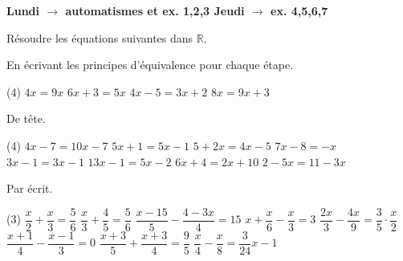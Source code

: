 \documentclass[a4paper,12pt]{report}
\begin{document}
{\bfseries Lundi $\longrightarrow$ automatismes et ex. 1,2,3  \hfill Jeudi $\longrightarrow$ ex. 4,5,6,7}


Résoudre les équations suivantes dans $\mathbb{R}$.

En écrivant les principes d'équivalence pour chaque étape.
	\begin{tasks}(4)
\task $4 x=9 x$
\task $6 x+3=5 x$
\task $4 x-5=3 x+2$
\task $8 x=9 x+3$
\end{tasks}
De tête.
\begin{tasks}(4)
\task $4 x-7=10 x-7$
\task $5 x+1=5 x-1$
\task $5+2 x=4 x-5$
\task $7 x-8=-x$
\task $3 x-1=3 x-1$
\task $13 x-1=5 x-2$
\task $6 x+4=2 x+10$
\task $2-5 x=11-3 x$
\end{tasks}

Par écrit.
	\begin{tasks}(3)
\task $\dfrac{x}{2}+\dfrac{x}{3}=\dfrac{5}{6}$
\task $\dfrac{x}{3}+\dfrac{4}{5}=\dfrac{5}{6}$
\task $\dfrac{x-15}{5}-\dfrac{4-3 x}{4}=15$
\task $x+\dfrac{x}{6}-\dfrac{x}{3}=3$
\task $\dfrac{2 x}{3}-\dfrac{4 x}{9}=\dfrac{3}{5} \cdot \dfrac{x}{2}$
\task $\dfrac{x+1}{4}-\dfrac{x-1}{3}=0$
\task $\dfrac{x+3}{5}+\dfrac{x+3}{4}=\dfrac{9}{5}$
\task $\dfrac{x}{4}-\dfrac{x}{8}=\dfrac{3}{24} x-1$
	\end{tasks}
	\begin{comment}
\begin{exo}[1]
Résoudre quatre fois de suite l'équation $\dfrac{x}{2}-3 x=\dfrac{5}{4}+x$, en utilisant la méthode proposée :
	\begin{tasks}
\task Votre manière de faire. 

(Dans les méthodes b), c) et d), simplifier au fur et à mesure l'expression obtenue.)
\task $\left[P E_2\right]$, en multipliant par 4 ; puis $\left[P E_1\right]$, en ajoutant $-4 x$; puis $\left[P E_2\right]$, en multipliant par $-\dfrac{1}{14}$.
\task $\left[P E_1\right]$, en ajoutant $-x$; puis $\left[P E_2\right]$, en multipliant par 2 ; puis $\left[P E_2\right]$, en multipliant par $-\dfrac{1}{7}$.
\task $\left[P E_1\right]$, en ajoutant $\dfrac{5}{2} x$; puis $\left[P E_1\right]$, en ajoutant $-\dfrac{5}{4} ;$ puis $\left[P E_2\right]$, en multipliant par $\dfrac{2}{7}$.
	\end{tasks}
\end{exo}

	\end{comment}
\end{document}
